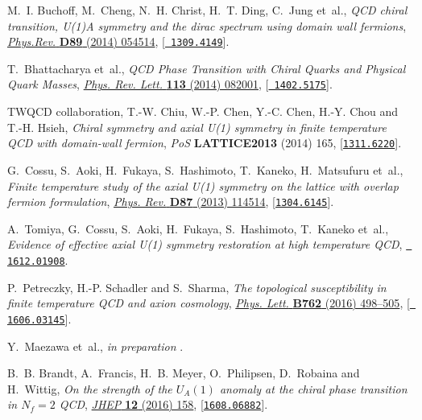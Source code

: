 \documentclass{PoS}
\begin{document}
\begin{thebibliography}{100}
M.~I. Buchoff, M.~Cheng, N.~H. Christ, H.~T. Ding, C.~Jung et~al., \emph{{QCD
  chiral transition, U(1)A symmetry and the dirac spectrum using domain wall
  fermions}},
  \href{http://dx.doi.org/10.1103/PhysRevD.89.054514}{\emph{Phys.Rev.} {\bf
  D89} (2014) 054514}, [\href{https://arxiv.org/abs/1309.4149}{{\tt
  1309.4149}}].

T.~Bhattacharya et~al., \emph{{QCD Phase Transition with Chiral Quarks and
  Physical Quark Masses}},
  \href{http://dx.doi.org/10.1103/PhysRevLett.113.082001}{\emph{Phys. Rev.
  Lett.} {\bf 113} (2014) 082001}, [\href{https://arxiv.org/abs/1402.5175}{{\tt
  1402.5175}}].

{\scshape TWQCD} collaboration, T.-W. Chiu, W.-P. Chen, Y.-C. Chen, H.-Y. Chou
  and T.-H. Hsieh, \emph{{Chiral symmetry and axial U(1) symmetry in finite
  temperature QCD with domain-wall fermion}}, {\emph{PoS} {\bf LATTICE2013}
  (2014) 165}, [\href{https://arxiv.org/abs/1311.6220}{{\tt 1311.6220}}].

G.~Cossu, S.~Aoki, H.~Fukaya, S.~Hashimoto, T.~Kaneko, H.~Matsufuru et~al.,
  \emph{{Finite temperature study of the axial U(1) symmetry on the lattice
  with overlap fermion formulation}},
  \href{http://dx.doi.org/10.1103/PhysRevD.88.019901,
  10.1103/PhysRevD.87.114514}{\emph{Phys. Rev.} {\bf D87} (2013) 114514},
  [\href{https://arxiv.org/abs/1304.6145}{{\tt 1304.6145}}].

A.~Tomiya, G.~Cossu, S.~Aoki, H.~Fukaya, S.~Hashimoto, T.~Kaneko et~al.,
  \emph{{Evidence of effective axial U(1) symmetry restoration at high
  temperature QCD}},  \href{https://arxiv.org/abs/1612.01908}{{\tt
  1612.01908}}.

P.~Petreczky, H.-P. Schadler and S.~Sharma, \emph{{The topological
  susceptibility in finite temperature QCD and axion cosmology}},
  \href{http://dx.doi.org/10.1016/j.physletb.2016.09.063}{\emph{Phys. Lett.}
  {\bf B762} (2016) 498--505}, [\href{https://arxiv.org/abs/1606.03145}{{\tt
  1606.03145}}].

Y.~Maezawa et~al., {\emph{in preparation} }.

B.~B. Brandt, A.~Francis, H.~B. Meyer, O.~Philipsen, D.~Robaina and H.~Wittig,
  \emph{{On the strength of the $U_A(1)$ anomaly at the chiral phase transition
  in $N_f=2$ QCD}},
  \href{http://dx.doi.org/10.1007/JHEP12(2016)158}{\emph{JHEP} {\bf 12} (2016)
  158}, [\href{https://arxiv.org/abs/1608.06882}{{\tt 1608.06882}}].


\end{thebibliography}
\end{document}
